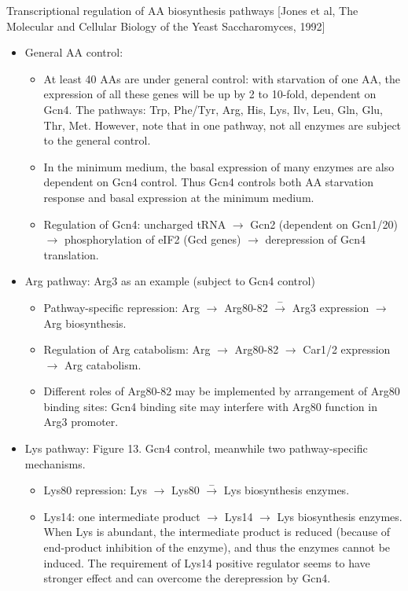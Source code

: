 \documentclass{report}
\begin{document}
Transcriptional regulation of AA biosynthesis pathways [Jones et al, The Molecular and Cellular Biology of the Yeast Saccharomyces, 1992]
\begin{itemize}
\item General AA control: 
\begin{itemize}
	\item At least 40 AAs are under general control: with starvation of one AA, the expression of all these genes will be up by 2 to 10-fold, dependent on Gcn4. The pathways: Trp, Phe/Tyr, Arg, His, Lys, Ilv, Leu, Gln, Glu, Thr, Met. However, note that in one pathway, not all enzymes are subject to the general control. 
	\item In the minimum medium, the basal expression of many enzymes are also dependent on Gcn4 control. Thus Gcn4 controls both AA starvation response and basal expression at the minimum medium. 
	\item Regulation of Gcn4: uncharged tRNA $\rightarrow$ Gcn2 (dependent on Gcn1/20) $\rightarrow$ phosphorylation of eIF2 (Gcd genes) $\rightarrow$ derepression of Gcn4 translation. 
\end{itemize}

\item Arg pathway: Arg3 as an example (subject to Gcn4 control)
\begin{itemize}
	\item Pathway-specific repression: Arg $\stackrel{}{\rightarrow}$ Arg80-82 $\stackrel{-}{\rightarrow}$ Arg3 expression $\stackrel{}{\rightarrow}$ Arg biosynthesis. 
	\item Regulation of Arg catabolism: Arg $\stackrel{}{\rightarrow}$ Arg80-82 $\stackrel{}{\rightarrow}$ Car1/2 expression $\stackrel{}{\rightarrow}$ Arg catabolism.
	\item Different roles of Arg80-82 may be implemented by arrangement of Arg80 binding sites: Gcn4 binding site may interfere with Arg80 function in Arg3 promoter. 
\end{itemize}

\item Lys pathway: Figure 13. Gcn4 control, meanwhile two pathway-specific mechanisms. 
\begin{itemize}
	\item Lys80 repression: Lys $\rightarrow$ Lys80 $\stackrel{-}{\rightarrow}$ Lys biosynthesis enzymes. 
	\item Lys14: one intermediate product $\rightarrow$ Lys14 $\rightarrow$ Lys biosynthesis enzymes. When Lys is abundant, the intermediate product is reduced (because of end-product inhibition of the enzyme), and thus the enzymes cannot be induced. The requirement of Lys14 positive regulator seems to have stronger effect and can overcome the derepression by Gcn4. 
\end{itemize}


\end{itemize}
\end{document}
